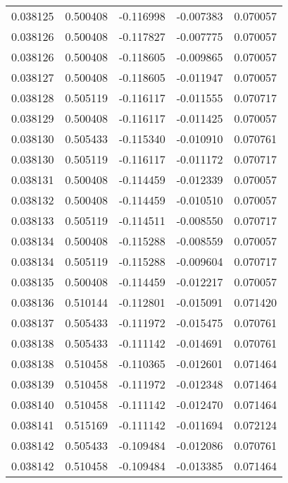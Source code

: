 \begin{tabular}{lrrrr}
0.038125    &  0.500408 & -0.116998 & -0.007383 &             0.070057 \\
0.038126    &  0.500408 & -0.117827 & -0.007775 &             0.070057 \\
0.038126    &  0.500408 & -0.118605 & -0.009865 &             0.070057 \\
0.038127    &  0.500408 & -0.118605 & -0.011947 &             0.070057 \\
0.038128    &  0.505119 & -0.116117 & -0.011555 &             0.070717 \\
0.038129    &  0.500408 & -0.116117 & -0.011425 &             0.070057 \\
0.038130    &  0.505433 & -0.115340 & -0.010910 &             0.070761 \\
0.038130    &  0.505119 & -0.116117 & -0.011172 &             0.070717 \\
0.038131    &  0.500408 & -0.114459 & -0.012339 &             0.070057 \\
0.038132    &  0.500408 & -0.114459 & -0.010510 &             0.070057 \\
0.038133    &  0.505119 & -0.114511 & -0.008550 &             0.070717 \\
0.038134    &  0.500408 & -0.115288 & -0.008559 &             0.070057 \\
0.038134    &  0.505119 & -0.115288 & -0.009604 &             0.070717 \\
0.038135    &  0.500408 & -0.114459 & -0.012217 &             0.070057 \\
0.038136    &  0.510144 & -0.112801 & -0.015091 &             0.071420 \\
0.038137    &  0.505433 & -0.111972 & -0.015475 &             0.070761 \\
0.038138    &  0.505433 & -0.111142 & -0.014691 &             0.070761 \\
0.038138    &  0.510458 & -0.110365 & -0.012601 &             0.071464 \\
0.038139    &  0.510458 & -0.111972 & -0.012348 &             0.071464 \\
0.038140    &  0.510458 & -0.111142 & -0.012470 &             0.071464 \\
0.038141    &  0.515169 & -0.111142 & -0.011694 &             0.072124 \\
0.038142    &  0.505433 & -0.109484 & -0.012086 &             0.070761 \\
0.038142    &  0.510458 & -0.109484 & -0.013385 &             0.071464 \\

\end{tabular}

